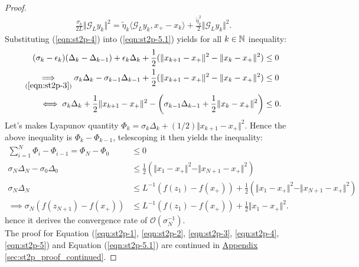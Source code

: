 \documentclass[12pt]{article}
\begin{document}
\begin{proof}
\begin{align*}
            \frac{\sigma_k}{2L}\Vert \mathcal G_L y_k\Vert^2
            = 
            \tilde \eta_k
            \langle  \mathcal G_Ly_k, x_+ - x_k\rangle
            + 
            \frac{\tilde \eta_k^2}{2}\Vert \mathcal G_L y_k\Vert^2. 
        \end{align*}
        Substituting (\ref*{eqn:st2p-4}) into (\ref*{eqn:st2p-5.1}) yields for all $k \in \mathbb N$ inequality: 
        \begin{align*}
            (\sigma_k - \epsilon_k)(\Delta_k - \Delta_{k - 1}) + \epsilon_k \Delta_k 
            + 
            \frac{1}{2}
            (
                \Vert x_{k + 1} - x_+\Vert^2 - \Vert x_k - x_+\Vert^2
            )
            &\le 0
            \\
            \underset{(\ref*{eqn:st2p-3})}{\implies}
            \sigma_k \Delta_k - \sigma_{k - 1}\Delta_{k - 1}
            + 
            \frac{1}{2}
            (
                \Vert x_{k + 1} - x_+\Vert^2 - \Vert x_k - x_+\Vert^2
            )
            &\le 
            0
            \\
            \iff 
            \sigma_k \Delta_k + \frac{1}{2}\Vert x_{k + 1} - x_+\Vert^2
            - 
            \left(
                \sigma_{k - 1}\Delta_{k - 1}
                + 
                \frac{1}{2}\Vert x_k - x_+\Vert^2
            \right)
            &\le 
            0.
        \end{align*}
        Let's makes Lyapunov quantity $\Phi_k = \sigma_k \Delta_k + (1/2)\Vert x_{k + 1} - x_+\Vert^2$. 
        Hence the above inequality is $\Phi_k - \Phi_{k - 1}$, telescoping it then yields the inequality: 
        \begin{align*}
            \sum_{i = 1}^{N}\Phi_i - \Phi_{i - 1} = \Phi_N - \Phi_0 
            &\le 0
            \\
            \sigma_N \Delta_N - \sigma_0 \Delta_0 &\le 
            \frac{1}{2}
            \left(
                \Vert x_1 - x_+\Vert^2 - \Vert x_{N + 1} - x_+\Vert^2
            \right)
            \\
            \sigma_N \Delta_N 
            &\le 
            L^{-1}(f(z_1) - f(x_+))
            +
            \frac{1}{2}\left(
                \Vert x_1 - x_+\Vert^2 - \Vert x_{N +1} - x_+\Vert^2
            \right)
            \\
            \implies 
            \sigma_N (f(z_{N + 1}) - f(x_+)) &\le 
            L^{-1}(f(z_1) - f(x_+)) + 
            \frac{1}{2}\Vert x_1 - x_+\Vert^2.
        \end{align*}
        hence it derives the convergence rate of $\mathcal O(\sigma_{N}^{-1})$. 
        \\
        The proof for Equation 
        (\ref*{eqn:st2p-1}, \ref*{eqn:st2p-2}, \ref*{eqn:st2p-3}, \ref*{eqn:st2p-4}, \ref*{eqn:st2p-5}) and Equation (\ref*{eqn:st2p-5.1}) are continued in 
        \hyperref[sec:st2p_proof_continued]{Appendix \ref*{sec:st2p_proof_continued}}. 
    \end{proof}
\end{document}
